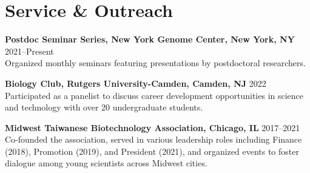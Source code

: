 \documentclass[letterpaper,11pt]{cv}
\begin{document}
\section{Service \& Outreach}
\begin{entrylist}

    \item \textbf{Postdoc Seminar Series, New York Genome Center, New York, NY} \hfill 2021--Present \\
    {\small Organized monthly seminars featuring presentations by postdoctoral researchers.}

    \item \textbf{Biology Club, Rutgers University-Camden, Camden, NJ} \hfill 2022\\
    {\small Participated as a panelist to discuss career development opportunities in science and technology with over 20 undergraduate students.}
    
    \item \textbf{Midwest Taiwanese Biotechnology Association, Chicago, IL} \hfill 2017--2021\\
    {\small Co-founded the association, served in various leadership roles including Finance (2018), Promotion (2019), and President (2021), and organized events to foster dialogue among young scientists across Midwest cities.}

\end{entrylist}
\end{document}
